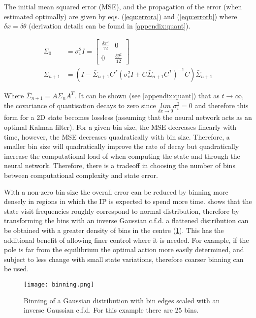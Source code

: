 \documentclass[../main.tex]{subfiles}
\begin{document}
The initial mean squared error (MSE), and the propagation of the error (when estimated optimally) are given by eqs. (\ref{equ:errora}) and (\ref{equ:errorb}) where $\delta x = \delta \theta$ (derivation details can be found in \cref{appendix:quant}).

\begin{align}
   \Sigma_0 &= \sigma_v^2 I = \begin{bmatrix} \frac{\delta x^2}{12} & 0 \\ 0 & \frac{\delta \theta^2}{12} \end{bmatrix}\label{equ:errora}\\
      \Sigma_{n+1} &= (I - \bar{\Sigma}_{n+1}C^T (\sigma_v^2 I + C \bar{\Sigma}_{n+1} C^T)^{-1} C)\bar{\Sigma}_{n+1} \label{equ:errorb}
\end{align}

Where $\bar{\Sigma}_{n+1} = A \Sigma_n A^T$. It can be shown (see \cref{appendix:quant}) that as $t \rightarrow \infty$, the covariance of quantisation decays to zero since $\underset{\delta x \rightarrow 0}{lim} \sigma_v^2 = 0$ and therefore this form for a 2D state becomes lossless (assuming that the neural network acts as an optimal Kalman filter). For a given bin size, the MSE decreases linearly with time, however, the MSE decreases quadratically with bin size. Therefore, a smaller bin size will quadratically improve the rate of decay but quadratically increase the computational load of when computing the state and through the neural network. Therefore, there is a tradeoff in choosing the number of bins between computational complexity and state error. 

With a non-zero bin size the overall error can be reduced by binning more densely in regions in which the IP is expected to spend more time.  shows that the state visit frequencies roughly correspond to normal distribution, therefore by transforming the bins with an inverse Gaussian c.f.d. a flattened distribution can be obtained with a greater density of bins in the centre (\cref{fig:binning}). This has the additional benefit of allowing finer control where it is needed. For example, if the pole is far from the equilibrium the optimal action more easily determined, and subject to less change with small state variations, therefore coarser binning can be used.

\begin{figure}[h]
   \centering
   \texttt{[image: binning.png]}
   \caption{Binning of a Gaussian distribution with bin edges scaled with an inverse Gaussian c.f.d. For this example there are 25 bins.}
   \label{fig:binning}
\end{figure}
\end{document}
